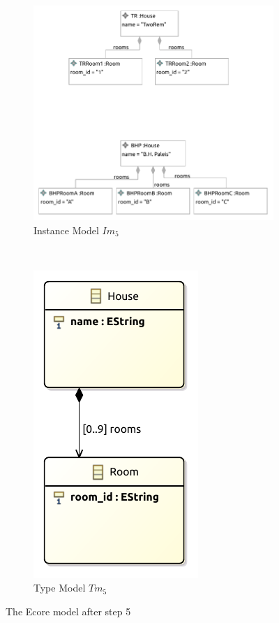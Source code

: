\begin{figure}[p]
    \centering
    \begin{subfigure}{0.98\textwidth}
        \centering
        \includegraphics{images/06_application/instance_model/step05.pdf}
        \caption{Instance Model $Im_5$}
        \label{fig:application:building_the_model:room_identifiers:ecore:instance_model}
    \end{subfigure}
    \\
    \begin{subfigure}{0.98\textwidth}
        \centering
        \includegraphics{images/06_application/type_model/step05.pdf}
        \caption{Type Model $Tm_5$}
        \label{fig:application:building_the_model:room_identifiers:ecore:type_model}
    \end{subfigure}
    \caption{The Ecore model after step 5}
    \label{fig:application:building_the_model:room_identifiers:ecore}
\end{figure}

